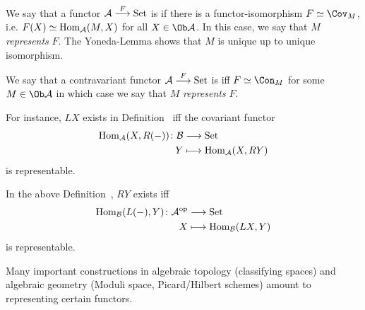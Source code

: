 \documentclass[a4paper,parskip=half,numbers=enddot, DIV=12]{scrreprt}
\begin{document}
  \begin{defi}
  	\begin{alphanumerate}
  		\item We say that a functor $\Aa\morphism[F] \cat{Set}$ is  if there is a functor-isomorphism $F\simeq \Cov_M$, i.e. $F(X) \simeq \operatorname{Hom}_{\mathcal{A}}(M,X)$ for all $X\in\Ob\Aa$. In this case, we say that $M$ \emph{represents} $F$. The Yoneda-Lemma shows that $M$ is unique up to unique isomorphism.
  		\item We say that a contravariant functor $\Aa\morphism[F]\cat{Set}$ is  iff $F\simeq \Con_M$ for some $M\in\Ob\Aa$ in which case we say that $M$ \emph{represents} $F$.
  	\end{alphanumerate}
  \end{defi}
  \begin{rem*}
  	\begin{alphanumerate}
  		\item  For instance, $LX$ exists in Definition~ iff the covariant functor 
  		\begin{align*}
  		\Hom_\Aa(X,R(-))\colon\Bb&\morphism\cat{Set}\\
  		Y &\longmapsto \Hom_\Aa(X, RY)
  		\end{align*}
  		is representable.
  		\item
  		In the above Definition~, $RY$ exists iff 
  		\begin{align*}
  		\Hom_\Bb(L(-), Y)\colon\Aa^\op&\morphism\cat{Set}\\
  		X&\longmapsto \Hom_\Bb(LX,Y)
  		\end{align*}
  		is representable.
  		\item 
  		Many important constructions in algebraic topology (classifying spaces) and algebraic geometry (Moduli space, Picard/Hilbert schemes) amount to representing certain functors.
  	\end{alphanumerate}
  \end{rem*}
\end{document}
